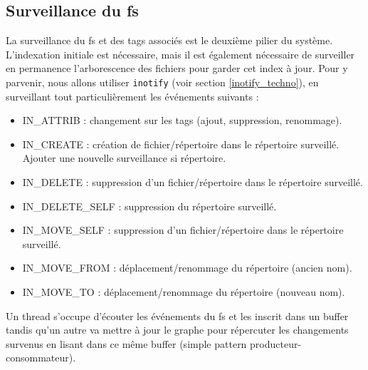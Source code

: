 \subsection{Surveillance du \acrshort{fs}}
La surveillance du \acrshort{fs} et des tags associés est le deuxième pilier du système. 
L'indexation initiale est nécessaire, mais il est également nécessaire de surveiller en permanence 
l'arborescence des fichiers pour garder cet index à jour. Pour y parvenir, nous allons utiliser 
\texttt{inotify} (voir section \ref{inotify_techno}), en surveillant tout particulièrement les événements 
suivants :
\begin{itemize}
    \item IN\_ATTRIB : changement sur les tags (ajout, suppression, renommage).
    \item IN\_CREATE : création de fichier/répertoire dans le répertoire surveillé. Ajouter une nouvelle surveillance si répertoire.
    \item IN\_DELETE : suppression d'un fichier/répertoire dans le répertoire surveillé.
    \item IN\_DELETE\_SELF : suppression du répertoire surveillé.
    \item IN\_MOVE\_SELF : suppression d'un fichier/répertoire dans le répertoire surveillé.
    \item IN\_MOVE\_FROM : déplacement/renommage du répertoire (ancien nom).
    \item IN\_MOVE\_TO : déplacement/renommage du répertoire (nouveau nom).
\end{itemize}
Un thread s'occupe d'écouter les événements du \acrshort{fs} et les inscrit dans un buffer 
tandis qu'un autre va mettre à jour le graphe pour répercuter les changements survenus en lisant 
dans ce même buffer (simple pattern producteur-consommateur).

